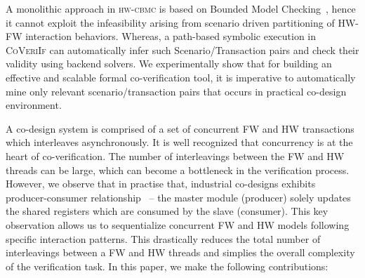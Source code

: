 \documentclass[sigconf]{acmart}
\newcommand{\tool}[1]{\textsc{#1}\xspace}
\newcommand{\hwcbmcv}{\tool{hw-cbmc}}
\newcommand{\verifox}{\tool{CoVeriIf}}
\begin{document}
A monolithic approach in \hwcbmcv is based on Bounded Model Checking~\cite{CKY03}, 
hence it cannot exploit the infeasibility arising from scenario driven
partitioning of HW-FW interaction behaviors.  Whereas, a path-based symbolic 
execution in \verifox can automatically infer such Scenario/Transaction 
pairs and check their validity using backend solvers.  We experimentally 
show that for building an effective and scalable formal co-verification tool, 
it is imperative to automatically mine only relevant scenario/transaction 
pairs that occurs in practical co-design environment. 
%


A co-design system is comprised of a set of concurrent FW and HW transactions 
which interleaves asynchronously. It is well recognized that concurrency is at
the heart of co-verification. The number of interleavings between the FW
and HW threads can be large, which can become a bottleneck in the
verification process.  
However, we observe that in practise that, industrial co-designs exhibits 
producer-consumer
relationship~\cite{polig2014micro,polig2014fpl,giefers2015accelerating} --
the master module (producer) solely updates the shared registers which are
consumed by the slave (consumer).  This key observation allows us to
sequentialize concurrent FW and HW models following specific interaction
patterns.  This drastically reduces the total number of interleavings 
between a FW and HW threads and simplies the overall complexity of the 
verification task. 
%
In this paper, we make the following contributions:
\end{document}
